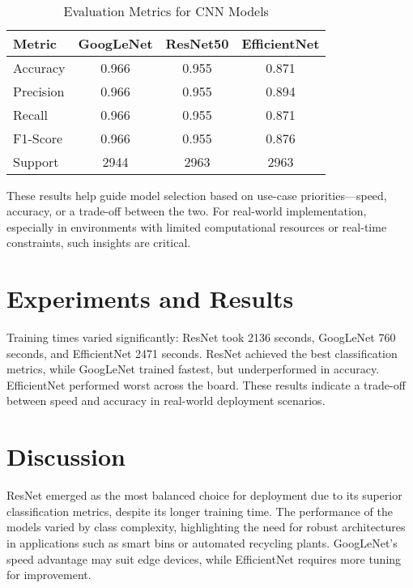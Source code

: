 \documentclass[11pt,twocolumn]{article}
\begin{document}
\begin{table}[h]
\centering
\caption{Evaluation Metrics for CNN Models}
\
\renewcommand{\arraystretch}{1.2} %
\begin{tabular}{|l|c|c|c|}
\hline
\textbf{\scriptsize Metric} & \textbf{\scriptsize GoogLeNet} & \textbf{\scriptsize ResNet50} & \textbf{\scriptsize EfficientNet} \\
\hline
Accuracy        & 0.966 & 0.955 & 0.871 \\
Precision       & 0.966 & 0.955 & 0.894 \\
Recall          & 0.966 & 0.955 & 0.871 \\
F1-Score        & 0.966 & 0.955 & 0.876 \\
Support         & 2944  & 2963  & 2963 \\
\hline
\end{tabular}
\label{tab:evaluation-smallheader}
\end{table}



These results help guide model selection based on use-case priorities—speed, accuracy, or a trade-off between the two. For real-world implementation, especially in environments with limited computational resources or real-time constraints, such insights are critical.




\section{Experiments and Results}
\label{sec:experiments}
Training times varied significantly: ResNet took 2136 seconds, GoogLeNet 760 seconds, and EfficientNet 2471 seconds. ResNet achieved the best classification metrics, while GoogLeNet trained fastest, but underperformed in accuracy. EfficientNet performed worst across the board. These results indicate a trade-off between speed and accuracy in real-world deployment scenarios.

\section{Discussion}
\label{sec:discussion}
ResNet emerged as the most balanced choice for deployment due to its superior classification metrics, despite its longer training time. The performance of the models varied by class complexity, highlighting the need for robust architectures in applications such as smart bins or automated recycling plants. GoogLeNet’s speed advantage may suit edge devices, while EfficientNet requires more tuning for improvement.
\end{document}
